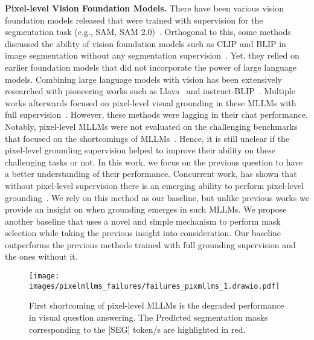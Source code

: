 \textbf{Pixel-level Vision Foundation Models.} There have been various vision foundation models released that were trained with supervision for the segmentation task (e.g., SAM, SAM 2.0)~\cite{kirillov2023segment, ravi2024sam}. Orthogonal to this, some methods discussed the ability of vision foundation models such as CLIP and BLIP in image segmentation without any segmentation supervision~\cite{luo2024emergent,hajimiri2024pay,wang2025sclip}. Yet, they relied on earlier foundation models that did not incorporate the power of large language models. Combining large language models with vision has been extensively researched with pioneering works such as Llava~\cite{liu2024visual, liu2024improved} and instruct-BLIP~\cite{dai2023instructblip}. Multiple works afterwards focused on pixel-level visual grounding in these MLLMs with full supervision~\cite{lai2024lisa,rasheed2024glamm,zhang2025llava,zhang2024omg,zhang2025llava,zhang2024omg}. However, these methods were lagging in their chat performance. Notably, pixel-level MLLMs were not evaluated on the challenging benchmarks that focused on the shortcomings of MLLMs~\cite{tong2024eyes,tong2024cambrian}. Hence, it is still unclear if the pixel-level grounding supervision helped to improve their ability on these challenging tasks or not. In this work, we focus on the previous question to have a better understanding of their performance. Concurrent work, has shown that without pixel-level supervision there is an emerging ability to perform pixel-level grounding~\cite{cao2024emerging}. We rely on this method as our baseline, but unlike previous works we provide an insight on when grounding emerges in such MLLMs. We propose another baseline that uses a novel and simple mechanism to perform mask selection while taking the previous insight into consideration. Our baseline outperforms the previous methods trained with full grounding supervision and the ones without it.


\begin{figure*}[t]
\centering
\texttt{[image: images/pixelmllms\_failures/failures\_pixmllms\_1.drawio.pdf]}
\vspace{-2em}
\caption{First shortcoming of pixel-level MLLMs is the degraded performance in visual question answering. The Predicted segmentation masks corresponding to the [SEG] token/s are highlighted in red.} 
\vspace{-1em}
\label{fig:shortcoming1}
\end{figure*}

